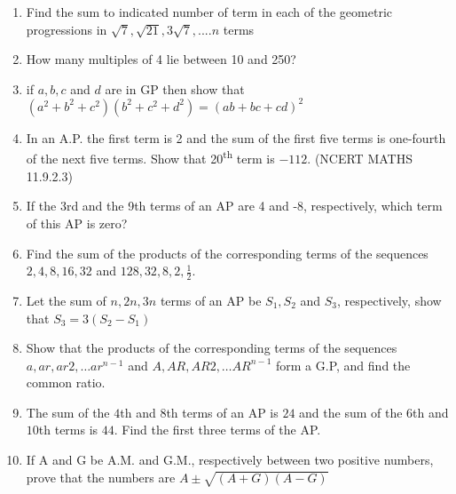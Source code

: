 \begin{enumerate}[label=\thesection.\arabic*,ref=\thesection.\theenumi]
\item Find the sum to indicated number of term in each of the geometric progressions in $\sqrt{7} ,\sqrt{21} , 3\sqrt{7}, ....n$ terms\\
\solution


\item How many multiples of 4 lie between 10 and 250?\\
\solution
\pagebreak

\item if $a,b,c$ and $d$ are in GP then show that $(a^{2}+b^{2}+c^{2})(b^{2}+c^{2}+d^{2})=(ab+bc+cd)^{2}$\\
\solution
\pagebreak

\item In an A.P. the first term is 2 and the sum of the first five terms is one-fourth of the next five terms. Show that 20\textsuperscript{th} term is $-112$. \hfill(NCERT MATHS 11.9.2.3)\\
\solution

\pagebreak
\item If the 3rd and the 9th terms of an AP are 4 and -8, respectively, which term of this AP is zero? \\
\solution
\pagebreak
\item Find the sum of the products of the corresponding terms of the sequences $2, 4, 8, 16, 32$ and $128, 32, 8, 2, \frac{1}{2}$.
\solution
\pagebreak

\item Let the sum of $n,2n,3n$ terms of an AP be $S_1,S_2$ and $S_3$, respectively, show that $S_3=3(S_2-S_1)$\\
\solution
\pagebreak

\item Show that the products of the corresponding terms of the sequences $a, ar, ar2, \ldots ar^{n-1}$ and $A, AR, AR2, \ldots AR^{n-1}$ form a G.P, and find the common ratio.
\solution
\pagebreak

\item
The sum of the $4$th and $8$th terms of an AP is $24$ and the sum of the $6$th and $10$th terms is $44$. Find the first three terms of the AP.\\
\solution

\newpage

\item
If A and G be A.M. and G.M., respectively between two positive numbers, prove that the numbers are $A \pm \sqrt{(A+G)(A-G)}$\\
\solution
\newpage


\end{enumerate}
